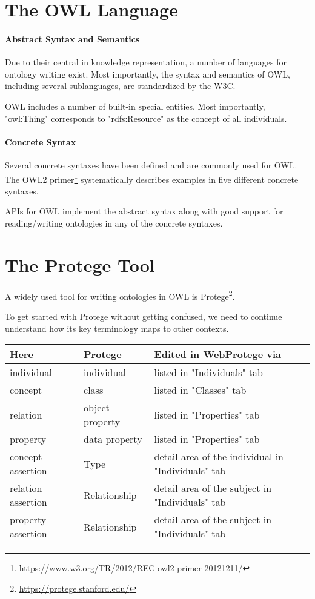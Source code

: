 \section{The OWL Language}

\paragraph{Abstract Syntax and Semantics}
Due to their central in knowledge representation, a number of languages for ontology writing exist.
Most importantly, the syntax and semantics of OWL, including several sublanguages, are standardized by the W3C.

OWL includes a number of built-in special entities.
Most importantly, "owl:Thing" corresponds to "rdfs:Resource" as the concept of all individuals.

\paragraph{Concrete Syntax}
Several concrete syntaxes have been defined and are commonly used for OWL.
The OWL2 primer\footnote{\url{https://www.w3.org/TR/2012/REC-owl2-primer-20121211/}} systematically describes examples in five different concrete syntaxes.

APIs for OWL implement the abstract syntax along with good support for reading/writing ontologies in any of the concrete syntaxes.

\section{The Protege Tool}

A widely used tool for writing ontologies in OWL is Protege\footnote{\url{https://protege.stanford.edu/}}.

To get started with Protege without getting confused, we need to continue understand how its key terminology maps to other contexts.
\begin{center}
\begin{tabular}{l|ll}
 Here       & Protege & Edited in WebProtege via \\
\hline
 individual & individual & listed in "Individuals" tab\\
 concept    & class   & listed in "Classes" tab  \\
 relation   & object property & listed in "Properties" tab\\
 property   & data property & listed in "Properties" tab\\
 concept assertion & Type & detail area of the individual in "Individuals" tab \\
 relation assertion & Relationship & detail area of the subject in "Individuals" tab \\
 property assertion & Relationship & detail area of the subject in "Individuals" tab \\
\end{tabular}
\end{center}

